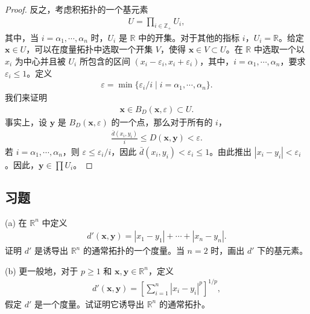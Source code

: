 \documentclass[../../main.tex]{subfiles}
\begin{document}
\begin{proof}
反之，考虑积拓扑的一个基元素
\begin{align*}
U = \prod_{i \in \mathbb{Z}_{+}} U_{i},
\end{align*}
其中，当 $i = \alpha_{1}, \cdots, \alpha_{n}$ 时，$U_{i}$ 是 $\mathbb{R}$ 中的开集。对于其他的指标 $i$，$U_{i} = \mathbb{R}$。给定 $\boldsymbol{x} \in U$，可以在度量拓扑中选取一个开集 $V$，使得 $\boldsymbol{x} \in V \subset U$。在 $\mathbb{R}$ 中选取一个以 $x_{i}$ 为中心并且被 $U_{i}$ 所包含的区间 $(x_{i} - \varepsilon_{i}, x_{i} + \varepsilon_{i})$，其中，$i = \alpha_{1}, \cdots, \alpha_{n}$，要求 $\varepsilon_{i} \leqslant 1$。定义
\begin{align*}
\varepsilon = \min \{\varepsilon_{i}/i \mid i = \alpha_{1}, \cdots, \alpha_{n}\}.
\end{align*}
我们来证明
\begin{align*}
\boldsymbol{x} \in B_{D}(\boldsymbol{x}, \varepsilon) \subset U.
\end{align*}
事实上，设 $\boldsymbol{y}$ 是 $B_{D}(\boldsymbol{x}, \varepsilon)$ 的一个点，那么对于所有的 $i$，
\begin{align*}
\frac{\bar{d}(x_{i}, y_{i})}{i} \leqslant D(\boldsymbol{x}, \boldsymbol{y}) < \varepsilon.
\end{align*}
若 $i = \alpha_{1}, \cdots, \alpha_{n}$，则 $\varepsilon \leqslant \varepsilon_{i}/i$，因此 $\bar{d}(x_{i}, y_{i}) < \varepsilon_{i} \leqslant 1$。由此推出 $|x_{i} - y_{i}| < \varepsilon_{i}$。因此，$\boldsymbol{y} \in \prod U_{i}$。
\end{proof}

\subsection*{习题}

\begin{exercise}\label{exercise:ch02-度量拓扑-1}
(a) 在 $\mathbb{R}^{n}$ 中定义
\begin{align*}
d'(\boldsymbol{x}, \boldsymbol{y}) = |x_{1} - y_{1}| + \cdots + |x_{n} - y_{n}|.
\end{align*}
证明 $d'$ 是诱导出 $\mathbb{R}^{n}$ 的通常拓扑的一个度量。当 $n = 2$ 时，画出 $d'$ 下的基元素。

(b) 更一般地，对于 $p \geqslant 1$ 和 $\boldsymbol{x}, \boldsymbol{y} \in \mathbb{R}^{n}$，定义
\begin{align*}
d'(\boldsymbol{x}, \boldsymbol{y}) = \left[\sum_{i=1}^{n} |x_{i} - y_{i}|^{p}\right]^{1/p},
\end{align*}
假定 $d'$ 是一个度量。试证明它诱导出 $\mathbb{R}^{n}$ 的通常拓扑。
\end{exercise}
\end{document}
